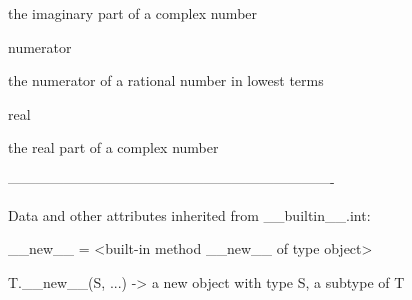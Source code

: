 \documentclass[letterpaper,10pt,english]{sphinxmanual}
\begin{document}
\begin{description}
\begin{description}
\begin{DUlineblock}{0em}
\begin{DUlineblock}{\DUlineblockindent}
\item[] the imaginary part of a complex number
\item[] 
\end{DUlineblock}
\item[] numerator
\item[]
\begin{DUlineblock}{\DUlineblockindent}
\item[] the numerator of a rational number in lowest terms
\item[] 
\end{DUlineblock}
\item[] real
\item[]
\begin{DUlineblock}{\DUlineblockindent}
\item[] the real part of a complex number
\item[] 
\end{DUlineblock}
\item[] ----------------------------------------------------------------------
\item[] Data and other attributes inherited from \_\_builtin\_\_.int:
\item[] 
\item[] \_\_new\_\_ = \textless{}built-in method \_\_new\_\_ of type object\textgreater{}
\item[]
\begin{DUlineblock}{\DUlineblockindent}
\item[] T.\_\_new\_\_(S, ...) -\textgreater{} a new object with type S, a subtype of T
\end{DUlineblock}
\end{DUlineblock}


\end{description}
\end{description}
\end{document}
